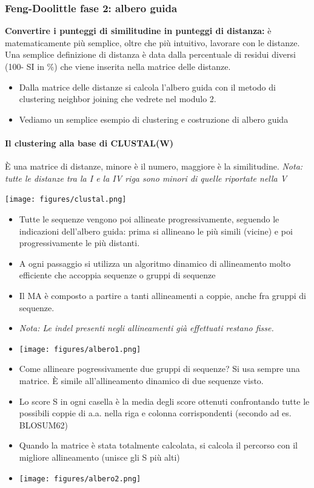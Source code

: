 \documentclass{article}
\begin{document}
\subsubsection{Feng-Doolittle fase 2: albero guida}
\textbf{Convertire i punteggi di similitudine in punteggi di distanza:} è matematicamente più semplice, oltre che più intuitivo, lavorare con le distanze. Una semplice definizione di distanza è data dalla percentuale di
residui diversi (100- SI in \%) che viene inserita nella matrice delle distanze.
\begin{itemize}
    \item Dalla matrice delle distanze si calcola l'albero guida con il metodo di clustering neighbor joining che vedrete nel modulo 2.
    \item Vediamo un semplice esempio di clustering e costruzione di albero guida
\end{itemize}
\paragraph{Il clustering alla base di CLUSTAL(W)} È una matrice di distanze, minore è il numero, maggiore è la similitudine.
\textit{Nota: tutte le distanze tra la I e la IV riga sono minori di quelle riportate nella V}
\begin{center}
    \texttt{[image: figures/clustal.png]}
\end{center}
\begin{itemize}
    \item Tutte le sequenze vengono poi allineate progressivamente, seguendo le indicazioni dell'albero
    guida: prima si allineano le più simili (vicine) e poi progressivamente le più distanti.
    \item A ogni passaggio si utilizza un algoritmo dinamico di allineamento molto efficiente che accoppia sequenze o gruppi di sequenze
    \item Il MA è composto a partire a tanti allineamenti a coppie, anche fra gruppi di sequenze.
    \item[] \textit{Nota: Le indel presenti negli allineamenti già effettuati restano fisse.}
    \item[]\texttt{[image: figures/albero1.png]}
    \item Come allineare pogressivamente due gruppi di sequenze? Si usa sempre una matrice. È simile all'allineamento dinamico di due sequenze visto.
    \item Lo score S in ogni
    casella è la media degli score ottenuti confrontando tutte le possibili coppie di a.a. nella riga e colonna
    corrispondenti (secondo ad es. BLOSUM62)
    \item Quando la matrice è stata totalmente calcolata, si calcola il percorso con il migliore allineamento (unisce gli S più alti)
    \item[] \texttt{[image: figures/albero2.png]}
\end{itemize}
\end{document}
